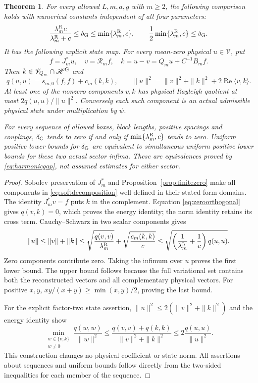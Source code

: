 \documentclass[11pt]{article}
\newtheorem{theorem}{Theorem}[section]
\newcommand{\Rea}{\operatorname{Re}}
\newcommand{\HH}{\mathscr H}
\newcommand{\VV}{\mathscr V}
\begin{document}
\begin{theorem}\label{thm:gaptransfer}
For every allowed $L,m,a,g$ with $m\geq2$, the following comparison
holds with numerical constants independent of all four parameters:
\begin{equation}\label{eq:harmonicgap}
 \frac{\lambda_m^{\rm R}c}{\lambda_m^{\rm R}+c}
 \leq\delta_{\rm G}\leq\min\{\lambda_m^{\rm R},c\},\qquad
 \frac12\min\{\lambda_m^{\rm R},c\}\leq\delta_{\rm G}.
\end{equation}
It has the following explicit state map. For every mean-zero physical
$u\in\VV$, put
\begin{equation}\label{eq:softdecomposition}
 f=J_m^*u,\quad v=\mathcal R_m f,\quad
 k=u-v=Q_mu+C^{-1}B_mf .
\end{equation}
Then $k\in\VV_{Q_m}\cap\HH^{\rm G}$ and
\begin{equation}\label{eq:softidentities}
 q(u,u)=s_{m,0}(f,f)+c_m(k,k),\qquad
 \|u\|^2=\|v\|^2+\|k\|^2+2\Rea\langle v,k\rangle .
\end{equation}
At least one of the nonzero components $v,k$ has physical Rayleigh
quotient at most $2q(u,u)/\|u\|^2$. Conversely each such component is an
actual admissible physical state under multiplication by $\psi$.

For every sequence of allowed boxes, block lengths, positive spacings
and couplings, $\delta_{\rm G}$ tends to zero if and only if
$\min\{\lambda_m^{\rm R},c\}$ tends to zero. Uniform positive lower
bounds for $\delta_{\rm G}$ are equivalent to simultaneous uniform
positive lower bounds for these two actual sector infima. These are
equivalences proved by \eqref{eq:harmonicgap}, not assumed estimates
for either sector.
\end{theorem}
\begin{proof}
Sobolev preservation of $J_m^*$ and Proposition~\ref{prop:finitezero}
make all components in \eqref{eq:softdecomposition} well defined in
their stated form domains. The identity $J_m^*v=f$ puts $k$ in the
complement. Equation \eqref{eq:zeroorthogonal} gives $q(v,k)=0$,
which proves the energy identity; the norm identity retains its
cross term. Cauchy--Schwarz in two scalar components gives
\[
 \|u\|\leq\|v\|+\|k\|
 \leq\sqrt{\frac{q(v,v)}{\lambda_m^{\rm R}}}
      +\sqrt{\frac{c_m(k,k)}c}
 \leq\sqrt{\left(\frac1{\lambda_m^{\rm R}}+\frac1c\right)q(u,u)}.
\]
Zero components contribute zero. Taking the infimum over $u$ proves
the first lower bound. The upper bound follows because the full
variational set contains both the reconstructed vectors and all
complementary physical vectors. For positive $x,y$,
$xy/(x+y)\geq\min(x,y)/2$, proving the last bound.

For the explicit factor-two state assertion,
$\|u\|^2\leq2(\|v\|^2+\|k\|^2)$ and the energy identity show
\[
 \min_{\substack{w\in\{v,k\}\\w\ne0}}
       \frac{q(w,w)}{\|w\|^2}
 \leq\frac{q(v,v)+q(k,k)}{\|v\|^2+\|k\|^2}
 \leq2\frac{q(u,u)}{\|u\|^2}.
\]
This construction changes no physical coefficient or state norm.
All assertions about sequences and uniform bounds follow directly
from the two-sided inequalities for each member of the sequence.
\end{proof}
\end{document}
